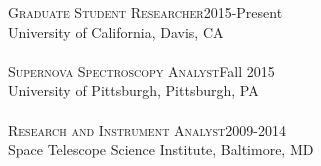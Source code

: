 \documentclass[10pt]{cv}
\begin{document}
\begin{llist}
\vspace{-0.1in}   
    \textsc{Graduate Student Researcher}\hfill2015-Present \\
    University of California, Davis, CA\\
\\
\textsc{Supernova Spectroscopy Analyst}\hfill Fall 2015\\ 
University of Pittsburgh, Pittsburgh, PA\\
\\
\textsc{Research and Instrument Analyst}\hfill 2009-2014 \\
Space Telescope Science Institute, Baltimore, MD\\


\end{llist}
\end{document}
